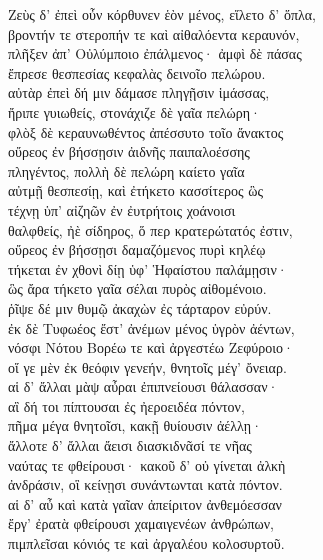 \begin{pages}
\begin{Leftside}
\quad{}Ζεὺς δ' ἐπεὶ οὖν κόρθυνεν ἑὸν μένος, εἵλετο δ' ὅπλα,\\
βροντήν τε στεροπήν τε καὶ αἰθαλόεντα κεραυνόν,\\
πλῆξεν ἀπ' Οὐλύμποιο ἐπάλμενος· ἀμφὶ δὲ πάσας \\
ἔπρεσε θεσπεσίας κεφαλὰς δεινοῖο πελώρου.\\
αὐτὰρ ἐπεὶ δή μιν δάμασε πληγῇσιν ἱμάσσας,\\
ἤριπε γυιωθείς, στονάχιζε δὲ γαῖα πελώρη· \\
φλὸξ δὲ κεραυνωθέντος ἀπέσσυτο τοῖο ἄνακτος\\
οὔρεος ἐν βήσσῃσιν ἀιδνῆς παιπαλοέσσης \\
πληγέντος, πολλὴ δὲ πελώρη καίετο γαῖα \\
αὐτμῇ θεσπεσίῃ, καὶ ἐτήκετο κασσίτερος ὣς\\
τέχνῃ ὑπ' αἰζηῶν ἐν ἐυτρήτοις χοάνοισι\\
θαλφθείς, ἠὲ σίδηρος, ὅ περ κρατερώτατός ἐστιν, \\
οὔρεος ἐν βήσσῃσι δαμαζόμενος πυρὶ κηλέῳ \\
τήκεται ἐν χθονὶ δίῃ ὑφ' Ἡφαίστου παλάμῃσιν· \\
ὣς ἄρα τήκετο γαῖα σέλαι πυρὸς αἰθομένοιο.\\
ῥῖψε δέ μιν θυμῷ ἀκαχὼν ἐς τάρταρον εὐρύν. \\

\quad{}ἐκ δὲ Τυφωέος ἔστ' ἀνέμων μένος ὑγρὸν ἀέντων,\\
νόσφι Νότου Βορέω τε καὶ ἀργεστέω Ζεφύροιο· \\
οἵ γε μὲν ἐκ θεόφιν γενεήν, θνητοῖς μέγ' ὄνειαρ.\\
αἱ δ' ἄλλαι μὰψ αὖραι ἐπιπνείουσι θάλασσαν·\\
αἳ δή τοι πίπτουσαι ἐς ἠεροειδέα πόντον,\\
πῆμα μέγα θνητοῖσι, κακῇ θυίουσιν ἀέλλῃ· \\
ἄλλοτε δ' ἄλλαι ἄεισι διασκιδνᾶσί τε νῆας \\
ναύτας τε φθείρουσι· κακοῦ δ' οὐ γίνεται ἀλκὴ \\
ἀνδράσιν, οἳ κείνῃσι συνάντωνται κατὰ πόντον. \\
αἱ δ' αὖ καὶ κατὰ γαῖαν ἀπείριτον ἀνθεμόεσσαν\\
ἔργ' ἐρατὰ φθείρουσι χαμαιγενέων ἀνθρώπων, \\
πιμπλεῖσαι κόνιός τε καὶ ἀργαλέου κολοσυρτοῦ. \\

\smallskip
\begin{center}\end{center}
\smallskip


\end{Leftside}
\end{pages}
